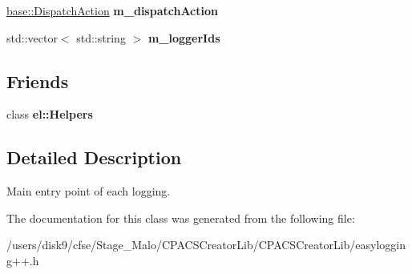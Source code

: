 \begin{DoxyCompactItemize}
\item 
\hypertarget{classel_1_1base_1_1Writer_acbea5b77953cf6e39baab015e83a4100}{\hyperlink{namespaceel_1_1base_a3aa2563d38e47388ba242a1694fc2839}{base\-::\-Dispatch\-Action} {\bfseries m\-\_\-dispatch\-Action}}\label{classel_1_1base_1_1Writer_acbea5b77953cf6e39baab015e83a4100}

\item 
\hypertarget{classel_1_1base_1_1Writer_a9137860437510e1a26e8b0c1814c7ae7}{std\-::vector$<$ std\-::string $>$ {\bfseries m\-\_\-logger\-Ids}}\label{classel_1_1base_1_1Writer_a9137860437510e1a26e8b0c1814c7ae7}

\end{DoxyCompactItemize}
\subsection*{Friends}
\begin{DoxyCompactItemize}
\item 
\hypertarget{classel_1_1base_1_1Writer_a2fb8a2c02cbf86247f093c118bed877a}{class {\bfseries el\-::\-Helpers}}\label{classel_1_1base_1_1Writer_a2fb8a2c02cbf86247f093c118bed877a}

\end{DoxyCompactItemize}


\subsection{Detailed Description}
Main entry point of each logging. 

The documentation for this class was generated from the following file\-:\begin{DoxyCompactItemize}
\item 
/users/disk9/cfse/\-Stage\-\_\-\-Malo/\-C\-P\-A\-C\-S\-Creator\-Lib/\-C\-P\-A\-C\-S\-Creator\-Lib/easylogging++.\-h\end{DoxyCompactItemize}
